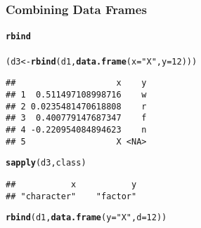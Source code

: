 \documentclass[paper=screen,mathserif]{beamer}\usepackage[]{graphicx}\usepackage[]{color}
\makeatletter
\newcommand{\hlnum}[1]{\textcolor[rgb]{0.686,0.059,0.569}{#1}}%
\newcommand{\hlstr}[1]{\textcolor[rgb]{0.192,0.494,0.8}{#1}}%
\newcommand{\hlstd}[1]{\textcolor[rgb]{0.345,0.345,0.345}{#1}}%
\newcommand{\hlkwb}[1]{\textcolor[rgb]{0.69,0.353,0.396}{#1}}%
\newcommand{\hlkwc}[1]{\textcolor[rgb]{0.333,0.667,0.333}{#1}}%
\newcommand{\hlkwd}[1]{\textcolor[rgb]{0.737,0.353,0.396}{\textbf{#1}}}%
\newenvironment{kframe}{%
 \def\at@end@of@kframe{}%
 \ifinner\ifhmode%
  \def\at@end@of@kframe{\end{minipage}}%
  \begin{minipage}{\columnwidth}%
 \fi\fi%
 \def\FrameCommand##1{\hskip\@totalleftmargin \hskip-\fboxsep
 \colorbox{shadecolor}{##1}\hskip-\fboxsep
     \hskip-\linewidth \hskip-\@totalleftmargin \hskip\columnwidth}%
 \MakeFramed {\advance\hsize-\width
   \@totalleftmargin\z@ \linewidth\hsize
   \@setminipage}}%
 {\par\unskip\endMakeFramed%
 \at@end@of@kframe}
\newenvironment{knitrout}{}{} %
\newcommand{\ft}[1]{\frametitle{#1}}
\newcommand{\fst}[1]{\framesubtitle{#1}}
\makeatother
\begin{document}
\begin{frame}[fragile]
  \ft{Combining Data Frames}  
  \fst{{\tt rbind}}
\begin{knitrout}\tiny
{}\color{fgcolor}\begin{kframe}
\begin{alltt}
\hlstd{(d3} \hlkwb{<-} \hlkwd{rbind}\hlstd{(d1,} \hlkwd{data.frame}\hlstd{(}\hlkwc{x} \hlstd{=} \hlstr{"X"}\hlstd{,} \hlkwc{y} \hlstd{=} \hlnum{12}\hlstd{)))}
\end{alltt}


{\ttfamily\noindent\color{warningcolor}{\#\# Warning in `[<-.factor`(`*tmp*`, ri, value = structure(c(4L, 3L, 1L, 2L, : invalid factor level, NA generated}}\begin{verbatim}
##                    x    y
## 1  0.511497108998716    w
## 2 0.0235481470618808    r
## 3  0.400779147687347    f
## 4 -0.220954084894623    n
## 5                  X <NA>
\end{verbatim}
\begin{alltt}
\hlkwd{sapply}\hlstd{(d3, class)}
\end{alltt}
\begin{verbatim}
##           x           y 
## "character"    "factor"
\end{verbatim}
\end{kframe}
\end{knitrout}
\begin{knitrout}\scriptsize
{}\color{fgcolor}\begin{kframe}
\begin{alltt}
\hlkwd{rbind}\hlstd{(d1,} \hlkwd{data.frame}\hlstd{(}\hlkwc{y} \hlstd{=} \hlstr{"X"}\hlstd{,} \hlkwc{d} \hlstd{=} \hlnum{12}\hlstd{))}
\end{alltt}


{\ttfamily\noindent\bfseries\color{errorcolor}{\#\# Error in match.names(clabs, names(xi)): names do not match previous names}}\end{kframe}
\end{knitrout}

\end{frame}
\end{document}

